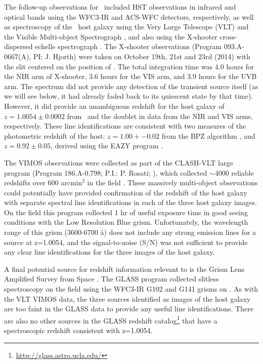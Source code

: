 The follow-up observations for \spock\ included HST observations in
infrared and optical bands using the WFC3-IR and ACS-WFC detectors,
respectively, as well as spectroscopy of the \spock\ host galaxy using
the Very Large Telescope (VLT) and the Visible Multi-object
Spectrograph \citep[VIMOS][]{LeFevre:2003}, and also using the
X-shooter cross-dispersed echelle spectrograph
\citep{Vernet:2011}.  The X-shooter observations
(Program 093.A-0667(A), PI: J. Hjorth) were taken on October 19th,
21st and 23rd (2014) with the slit centered on the position of .  
The total integration time was 4.0 hours for the NIR arm of X-shooter, 
3.6 hours for the VIS arm, and 3.9 hours for the UVB arm.
The spectrum did not provide any
detection of the transient source itself (as we will see below, it had
already faded back to its quiescent state by that time).  However, it
did provide an unambiguous redshift for the host galaxy of
$z=1.0054\pm0.0002$ from \Ha\ and the  doublet in 
data from the NIR and VIS arms, respectively.  These line
identifications are consistent with two measures of the photometric
redshift of the host: $z=1.00+-0.02$ from the BPZ algorithm
\citep{Benitez:2000}, and $z=0.92\pm0.05$, derived using the EAZY
program \citep{Brammer:2008}.

The VIMOS observations were collected as part of the CLASH-VLT large program (Program 186.A-0.798; P.I.: P. Rosati; \citealt{Rosati:2014}), which collected $\sim$4000 reliable redshifts over 600 arcmin$^2$ in the  field \citep{Grillo:2015a,Balestra:2015}.  These massively multi-object observations could potentially have provided confirmation of the redshift of the \spock host galaxy with separate spectral line identifications in each of the three host galaxy images.  On the  field this program collected 1 hr of useful exposure time in good seeing conditions with the Low Resolution Blue grism.  Unfortunately, the wavelength range of this grism (3600-6700 \aa) does not include any strong emission lines for a source at z=1.0054, and the signal-to-noise (S/N) was not sufficient to provide any clear line identifications for the three images of the \spock host galaxy. 

A final potential source for redshift information relevant to \spock is the Grism Lens Amplified Survey from Space \citep[GLASS; PID: HST-GO-13459; PI:T. Treu][]{Schmidt:2014,Treu:2015a}. The GLASS program collected slitless spectroscopy on the  field using the WFC3-IR G102 and G141 grisms on \HST.  As with the VLT VIMOS data, the three sources identified as images of the \spock host galaxy are too faint in the GLASS data to provide any useful line identifications.  There are also no other sources in the GLASS redshift catalog\footnote{\url{http://glass.astro.ucla.edu/}} that have a spectroscopic redshift consistent with z=1.0054.   



